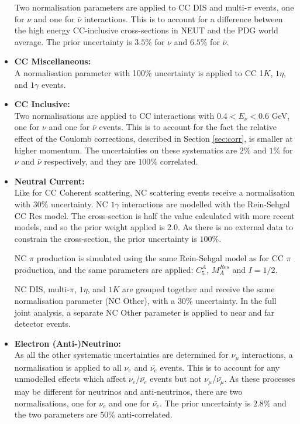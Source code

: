 \begin{itemize}
Two normalisation parameters are applied to CC DIS and multi-$\pi$ events, one for $\nu$ and one for $\bar{\nu}$ interactions. This is to account for a difference between the high energy CC-inclusive cross-sections in NEUT and the PDG world average. The prior uncertainty is $3.5\%$ for $\nu$ and $6.5\%$ for $\bar{\nu}$.

\item \textbf{CC Miscellaneous:}\\
A normalisation parameter with 100$\%$ uncertainty is applied to CC 1$K$, $1\eta$, and $1\gamma$ events.

\item \textbf{CC Inclusive:}\\
Two normalisations are applied to CC interactions with $0.4 < E_{\nu} < 0.6$ GeV, one for $\nu$ and one for $\bar{\nu}$ events. This is to account for the fact the relative effect of the Coulomb corrections, described in Section \ref{sec:corr}, is smaller at higher momentum. The uncertainties on these systematics are $2\%$ and $1\%$ for $\nu$ and $\bar{\nu}$ respectively, and they are $100\%$ correlated.

\item \textbf{Neutral Current:}\\
Like for CC Coherent scattering, NC scattering events receive a normalisation with $30\%$ uncertainty. NC $1\gamma$ interactions are modelled with the Rein-Sehgal CC Res model. The cross-section is half the value calculated with more recent models\cite{NCxsec}, and so the prior weight applied is 2.0. As there is no external data to constrain the cross-section, the prior uncertainty is $100\%$.

NC $\pi$ production is simulated using the same Rein-Sehgal model as for CC $\pi$ production, and the same parameters are applied: $C^{A}_{5}$, $M^{Res}_{A}$ and $I=1/2$.

NC DIS, multi-$\pi$, $1\eta$, and $1K$ are grouped together and receive the same normalisation parameter (NC Other), with a $30\%$ uncertainty. In the full joint analysis, a separate NC Other parameter is applied to near and far detector events.

\item \textbf{Electron (Anti-)Neutrino:}\\
As all the other systematic uncertainties are determined for $\nu_{\mu}$ interactions, a normalisation is applied to all $\nu_{e}$ and $\bar{\nu_{e}}$ events. This is to account for any unmodelled effects which affect $\nu_{e}$/$\bar{\nu_{e}}$ events but not $\nu_{\mu}$/$\bar{\nu_{\mu}}$. As these processes may be different for neutrinos and anti-neutrinos, there are two normalisations, one for $\nu_{e}$ and one for $\bar{\nu_{e}}$. The prior uncertainty is $2.8\%$ and the two parameters are $50\%$ anti-correlated.


\end{itemize}
